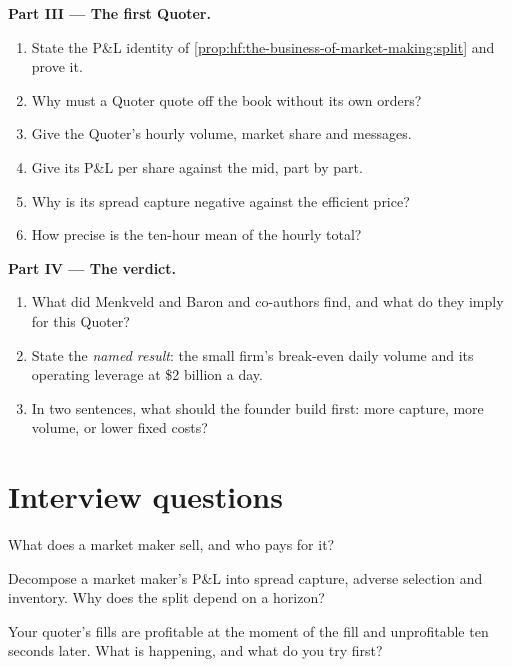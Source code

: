 \begin{problem}
\medskip\noindent\textbf{Part III --- The first Quoter.}
\begin{enumerate}[resume]
\item State the P\&L identity of \cref{prop:hf:the-business-of-market-making:split} and prove it.
\item Why must a Quoter quote off the book without its own orders?
\item Give the Quoter's hourly volume, market share and messages.
\item Give its P\&L per share against the mid, part by part.
\item Why is its spread capture negative against the efficient price?
\item How precise is the ten-hour mean of the hourly total?
\end{enumerate}

\medskip\noindent\textbf{Part IV --- The verdict.}
\begin{enumerate}[resume]
\item What did Menkveld and Baron and co-authors find, and what do they imply for this Quoter?
\item State the \emph{named result}: the small firm's break-even daily volume and its operating leverage at \$2 billion a day.
\item In two sentences, what should the founder build first: more capture, more volume, or lower fixed costs?
\end{enumerate}
\end{problem}

\section{Interview questions}

\begin{interviewq}\label{iq:hf:the-business-of-market-making:1}
What does a market maker sell, and who pays for it?
\end{interviewq}

\begin{interviewq}\label{iq:hf:the-business-of-market-making:2}
Decompose a market maker's P\&L into spread capture, adverse selection and inventory. Why does the split depend on a horizon?
\end{interviewq}

\begin{interviewq}\label{iq:hf:the-business-of-market-making:3}
Your quoter's fills are profitable at the moment of the fill and unprofitable ten seconds later. What is happening, and what do you try first?
\end{interviewq}

